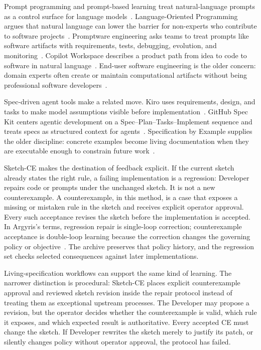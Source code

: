 \documentclass[11pt]{article}
\begin{document}
Prompt programming and prompt-based learning treat natural-language prompts as a control surface
for language models~\cite{reynolds2021promptprogramming,liu2023pretrainpromptpredict}.
Language-Oriented Programming argues that natural language can lower the barrier for non-experts
who contribute to software projects~\cite{beheshti2024nlop}.  Promptware engineering asks teams
to treat prompts like software artifacts with requirements, tests, debugging, evolution, and
monitoring~\cite{chen2025promptware}.  Copilot Workspace describes a product path from idea to
code to software in natural language~\cite{dohmke2024copilotworkspace}.
End-user software engineering is the older concern: domain experts often create or maintain
computational artifacts without being professional software developers~\cite{ko2011enduser}.

Spec-driven agent tools make a related move.  Kiro uses requirements, design, and tasks to make
model assumptions visible before implementation~\cite{swaminathan2025kiro}.  GitHub Spec Kit
centers agentic development on a Spec--Plan--Tasks--Implement sequence and treats specs as
structured context for agents~\cite{github2026speckit}.  Specification by Example supplies the
older discipline: concrete examples become living documentation when they are executable enough
to constrain future work~\cite{adzic2011specification}.

Sketch-CE makes the destination of feedback explicit.  If the current sketch already states the
right rule, a failing implementation is a regression: Developer repairs code or prompts under
the unchanged sketch.  It is not a new counterexample.  A counterexample, in this method, is a
case that exposes a missing or mistaken rule in the sketch and receives explicit operator
approval.  Every such acceptance revises the sketch before the implementation is accepted.  In
Argyris's terms, regression repair is single-loop correction; counterexample acceptance is
double-loop learning because the correction changes the governing policy or
objective~\cite{argyris1977doubleloop}.  The archive preserves that policy history, and the
regression set checks selected consequences against later implementations.

Living-specification workflows can support the same kind of learning.  The narrower distinction
is procedural: Sketch-CE places explicit counterexample approval and reviewed sketch revision
inside the repair protocol instead of treating them as exceptional upstream processes.  The
Developer may propose a revision, but the operator decides whether the counterexample is valid,
which rule it exposes, and which expected result is authoritative.  Every accepted CE must
change the sketch.  If Developer rewrites the sketch merely to justify its patch, or silently
changes policy without operator approval, the protocol has failed.
\end{document}
